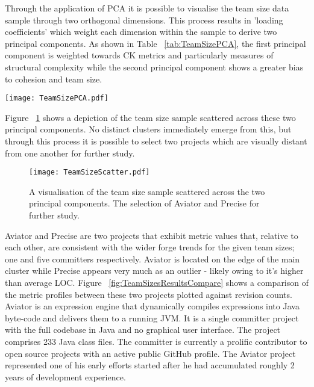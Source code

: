 Through the application of PCA it is possible to visualise the team size data sample through two orthogonal dimensions. This process results in 'loading coefficients' which weight each dimension within the sample to derive two principal components. As shown in Table ~\ref{tab:TeamSizePCA}, the first principal component is weighted towards CK metrics and particularly measures of structural complexity while the second principal component shows a greater bias to cohesion and team size.

\begin{table}
\begin{tabular}
 \centering 
 \texttt{[image: TeamSizePCA.pdf]}
 \label{tab:TeamSizePCA}
\end{tabular}
\end{table}

Figure ~\ref{fig:TeamSizeScatter} shows a depiction of the team size sample scattered across these two principal components. No distinct clusters immediately emerge from this, but through this process it is possible to select two projects which are visually distant from one another for further study.

\begin{figure}[htbp!] 
\centering    
\texttt{[image: TeamSizeScatter.pdf]}
\caption{A visualisation of the team size sample scattered across the two principal components. The selection of Aviator and Precise for further study.}
\label{fig:TeamSizeScatter}
\end{figure}

Aviator and Precise are two projects that exhibit metric values that, relative to each other, are consistent with the wider forge trends for the given team sizes; one and five committers respectively. Aviator is located on the edge of the main cluster while Precise appears very much as an outlier - likely owing to it's higher than average LOC. Figure ~\ref{fig:TeamSizesResultsCompare} shows a comparison of the metric profiles between these two projects plotted against revision counts. Aviator is an expression engine that dynamically compiles expressions into Java byte-code and delivers them to a running JVM. It is a single committer project with the full codebase in Java and no graphical user interface. The project comprises 233 Java class files. The committer is currently a prolific contributor to open source projects with an active public GitHub profile. The Aviator project represented one of his early efforts started after he had accumulated roughly 2 years of development experience. 


